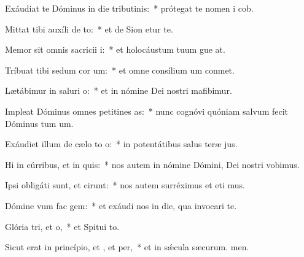 \item Exáudiat te Dóminus in die tributinis:~* prótegat te nomen i cob.
\item Mittat tibi auxíli de to:~* et de Sion etur te.
\item Memor sit omnis sacricii i:~* et holocáustum tuum gue at.
\item Tríbuat tibi sedum cor um:~* et omne consílium um conmet.
\item Lætábimur in saluri o:~* et in nómine Dei nostri mafibimur.
\item Impleat Dóminus omnes petitines as:~* nunc cognóvi quóniam salvum fecit Dóminus tum um.
\item Exáudiet illum de cælo to o:~* in potentátibus salus teræ jus.
\item Hi in cúrribus, et  in quis:~* nos autem in nómine Dómini, Dei nostri vobimus.
\item Ipsi obligáti sunt, et cirunt:~* nos autem surréximus et eti mus.
\item Dómine vum fac gem:~* et exáudi nos in die, qua invocari te.
\item Glória tri, et o,~* et Spitui to.
\item Sicut erat in princípio, et , et per,~* et in sǽcula sæcurum. men.
